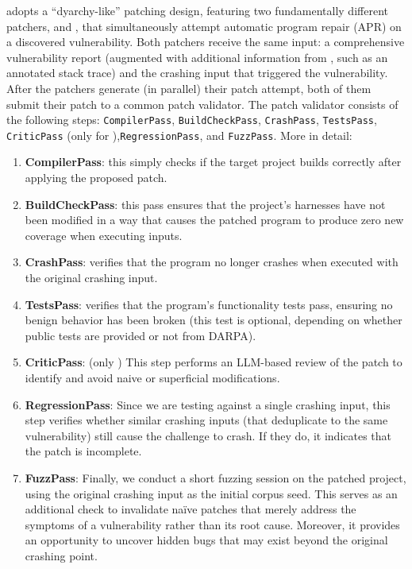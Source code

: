 \artiphishell adopts a ``dyarchy-like'' patching design, featuring two fundamentally different patchers, \patchery and \patcherq, that simultaneously attempt automatic program repair (APR) on a discovered vulnerability.
Both patchers receive the same input: a comprehensive vulnerability report (augmented with additional information from \poiguy, such as an annotated stack trace) and the crashing input that triggered the vulnerability.
After the patchers generate (in parallel) their patch attempt, both of them submit their patch to a common patch validator.
The patch validator consists of the following steps:
\texttt{CompilerPass}, \texttt{BuildCheckPass}, \texttt{CrashPass}, \texttt{TestsPass}, \texttt{CriticPass} (only for \patcherq),\texttt{RegressionPass}, and \texttt{FuzzPass}.
More in detail:
\begin{enumerate}
    \item \textbf{CompilerPass}: this simply checks if the target project builds correctly after applying the proposed patch.
    \item \textbf{BuildCheckPass}: this pass ensures that the project's harnesses have not been modified in a way that causes the patched program to produce zero new coverage when executing inputs.
    \item \textbf{CrashPass}: verifies that the program no longer crashes when executed with the original crashing input.
    \item \textbf{TestsPass}: verifies that the program's functionality tests pass, ensuring no benign behavior has been broken (this test is optional, depending on whether public tests are provided or not from DARPA).
    \item \textbf{CriticPass}: (only \patcherq) This step performs an LLM-based review of the patch to identify and avoid naive or superficial modifications.
    \item \textbf{RegressionPass}: Since we are testing against a single crashing input, this step verifies whether similar crashing inputs (that deduplicate to the same vulnerability) still cause the challenge to crash. If they do, it indicates that the patch is incomplete.
    \item \textbf{FuzzPass}: Finally, we conduct a short fuzzing session on the patched project, using the original crashing input as the initial corpus seed. This serves as an additional check to invalidate naïve patches that merely address the symptoms of a vulnerability rather than its root cause. Moreover, it provides an opportunity to uncover hidden bugs that may exist beyond the original crashing point.

\end{enumerate}


